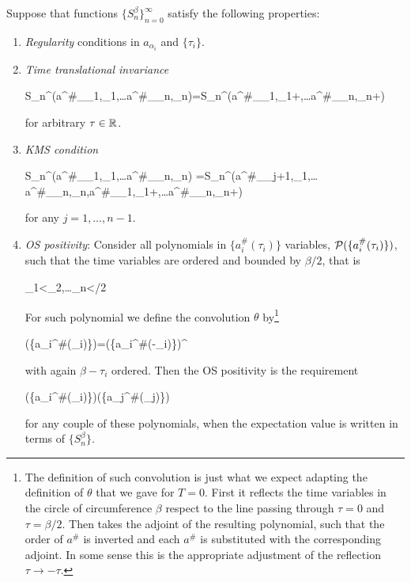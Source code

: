 \documentclass[../main/main.tex]{subfiles}
\begin{document}
\begin{theorem} Suppose that functions $\{S_n^\beta\}_{n=0}^\infty$ satisfy the following properties: 

\begin{enumerate}[label=(\arabic*)]
	\item \emph{Regularity} conditions in $a_{\alpha_i}$ and $\{\tau_i\}$.
	\item \emph{Time translational invariance}
	\begin{eq}
		S_n^\beta(a^\#_{\alpha_1},\tau_1,\ldots a^\#_{\alpha_n},\tau_n)=S_n^\beta(a^\#_{\alpha_1},\tau_1+\tau,\ldots a^\#_{\alpha_n},\tau_n+\tau)
	\end{eq}
	for arbitrary $\tau\in\mathbb{R}$.
	\item \emph{KMS condition} 
	\begin{eq}
		S_n^\beta(a^\#_{\alpha_1},\tau_1,\ldots a^\#_{\alpha_n},\tau_n)
		=S_n^\beta(a^\#_{\alpha_{j+1}},\tau_1,\ldots a^\#_{\alpha_n},\tau_n,a^\#_{\alpha_1},\tau_1+\beta,\ldots a^\#_{\alpha_n},\tau_n+\beta)
	\end{eq}
	for any $j=1,\ldots,n-1$.
	\item \emph{OS positivity}: Consider all polynomials in $\{a_i^\#(\tau_i)\}$ variables, $\mathcal P(\{a_i^\#(\tau_i)\})$, such that the time variables are ordered and bounded by $\beta/2$, that is
	\begin{eq}
		\tau_1<\tau_2,\ldots\tau_n<\beta/2
	\end{eq}
	For such polynomial we define the convolution $\theta$ by\footnote{The definition of such convolution is just what we expect adapting the definition of $\theta$ that we gave for $T=0$. First it reflects the time variables in the circle of circumference $\beta$ respect to the line passing through $\tau=0$ and $\tau=\beta/2$. Then takes the adjoint of the resulting polynomial, such that the order of $a^\#$ is inverted and each $a^\#$ is substituted with the corresponding adjoint. In some sense this is the appropriate adjustment of the reflection $\tau\to-\tau$.}
	\begin{eq}
		\theta\polyn(\{a_i^\#(\tau_i)\})=\polyn(\{a_i^\#(\beta-\tau_i)\})^\dagger
	\end{eq}
	with again $\beta-\tau_i$ ordered. Then the OS positivity is the requirement
	\begin{eq}
		\langle \polyn(\{a_i^\#(\tau_i)\})\theta \polyn(\{a_j^\#(\tau_j)\})\geq0
	\end{eq}
	for any couple of these polynomials, when the expectation value is written in terms of $\{S_n^\beta\}$. 
\end{enumerate}


\end{theorem}
\end{document}
